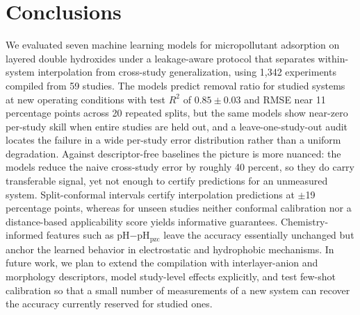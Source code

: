 \section{Conclusions}
\label{sec:conclusions}

We evaluated seven machine learning models for micropollutant adsorption
on layered double hydroxides under a leakage-aware protocol that
separates within-system interpolation from cross-study generalization,
using 1,342 experiments compiled from 59 studies. The models predict
removal ratio for studied systems at new operating conditions with test
$R^2$ of $0.85 \pm 0.03$ and RMSE near 11 percentage points across 20
repeated splits, but the same models show near-zero per-study skill when
entire studies are held out, and a leave-one-study-out audit locates the
failure in a wide per-study error distribution rather than a uniform
degradation. Against descriptor-free baselines the picture is more
nuanced: the models reduce the naive cross-study error by roughly 40
percent, so they do carry transferable signal, yet not enough to certify
predictions for an unmeasured system. Split-conformal
intervals certify interpolation predictions at $\pm$19 percentage points,
whereas for unseen studies neither conformal calibration nor a
distance-based applicability score yields informative guarantees.
Chemistry-informed features such as pH$-$pH$_{\mathrm{pzc}}$ leave the
accuracy essentially unchanged but anchor the learned behavior in
electrostatic and hydrophobic mechanisms. In
future work, we plan to extend the compilation with interlayer-anion and
morphology descriptors, model study-level effects explicitly, and test
few-shot calibration so that a small number of measurements of a new
system can recover the accuracy currently reserved for studied ones.
